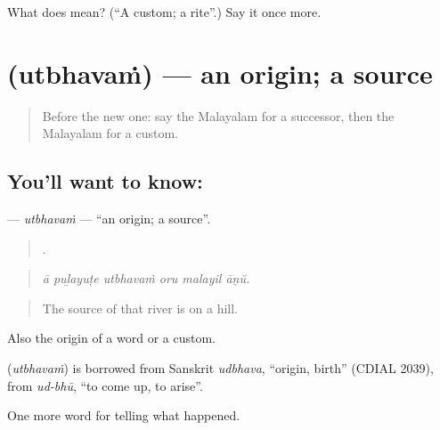 \begin{tcolorbox}[breakable,colback=teal!4,colframe=teal!35!black,title={Before you move on}]
What does  mean? (\textquotedblleft{}A custom; a rite\textquotedblright{}.) Say it once more.
\end{tcolorbox}
\section[\texorpdfstring{\ml{ഉത്ഭവം} (utbhavaṁ)}{ഉത്ഭവം (utbhavaṁ)}]{ (utbhavaṁ) — an origin; a source}

\label{lesson:ML-C395-utbhavam}



\begin{quote}
Before the new one: say the Malayalam for a successor, then the Malayalam for a custom.
\end{quote}

\subsection*{You'll want to know: }
\textbf{} — \emph{utbhavaṁ} — \textquotedblleft{}an origin; a source\textquotedblright{}.

\begin{quote}
     .
\end{quote}

\begin{quote}
\emph{ā puḻayuṭe utbhavaṁ oru malayil āṇŭ.}
\end{quote}

\begin{quote}
The source of that river is on a hill.
\end{quote}

Also the origin of a word or a custom.

\begin{cousinweb}
\textbf{} (\emph{utbhavaṁ}) is borrowed from Sanskrit \emph{udbhava}, \textquotedblleft{}origin, birth\textquotedblright{} (CDIAL 2039), from \emph{ud-bhū}, \textquotedblleft{}to come up, to arise\textquotedblright{}.
\end{cousinweb}

\begin{grammarlens}[title={What you've built}]
One more word for telling what happened.
\end{grammarlens}

